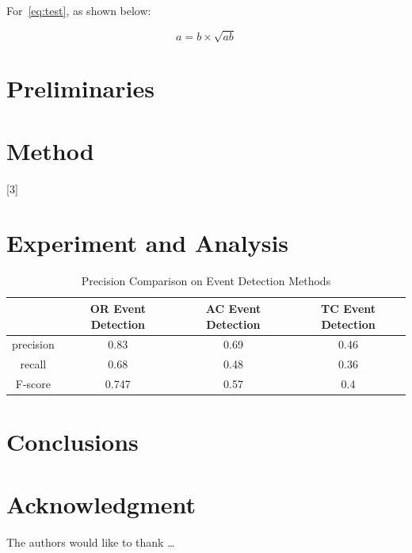 For~\cref{eq:test},
as shown below:

\begin{equation}\label{eq:test}
a = b \times \sqrt{ab}
\end{equation}

\blindmathpaper

\section{Preliminaries} \label{sec-preliminaries}

\blindtext

\gliMarker  %


\section{Method} \label{sec-method}

\blindtext
{}[3]
\blinditemize
\blindenumerate

\blindmathtrue
\blindmathfalse
\blinddescription


\section{Experiment and Analysis} \label{sec-experiment}


\begin{table}  \centering
  \caption{Precision Comparison on Event Detection Methods}
  \label{tbl:overall-experiments}
  \begin{tabular}{cccc}
\toprule
    & OR Event Detection & AC Event Detection & TC Event Detection \\
\midrule
    precision & 0.83 & 0.69 & 0.46 \\
    recall & 0.68 & 0.48 & 0.36 \\
    F-score & 0.747 & 0.57 & 0.4 \\
\bottomrule
\end{tabular}
\end{table}


\section{Conclusions} \label{sec-conclusions}

\blindtext

\section*{Acknowledgment}

\lipsum[1]


The authors would like to thank \ldots

